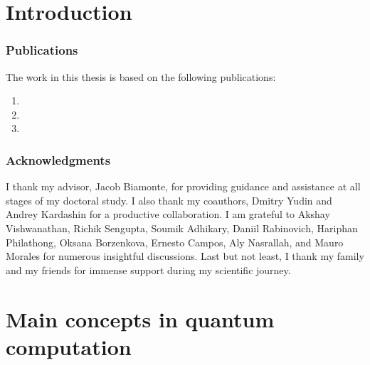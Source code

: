 

\chapter*{Introduction}




\subsection*{Publications}
The work in this thesis is based on the following publications:

\begin{enumerate}
    \item {}
    \item {}
    \item {}
\end{enumerate}

\subsection*{Acknowledgments} I thank my advisor, Jacob Biamonte, for providing guidance and assistance at all stages of my doctoral study. I also thank my coauthors, Dmitry Yudin and Andrey Kardashin for a productive collaboration. I am grateful to Akshay Vishwanathan, Richik Sengupta, Soumik Adhikary, Daniil Rabinovich, Hariphan Philathong, Oksana Borzenkova, Ernesto Campos, Aly Nasrallah, and Mauro Morales for numerous insightful discussions. Last but not least, I thank my family and my friends for immense support during my scientific journey.

\chapter{Main concepts in quantum computation}
\label{chap:quantum_basics}


